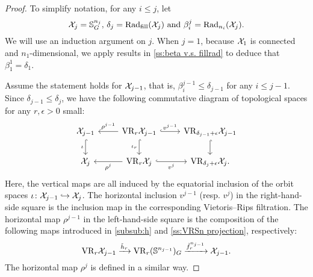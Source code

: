 \begin{proof}
    To simplify notation, for any $i \leq j$, let
    \[
        \mathcal{X}_j = \mathbb{S}^{n_j}_G, \,\delta_j = \mathrm{Rad}_{\mathrm{fill}}(\mathcal{X}_j) \text{ and }\beta_i^j = \mathrm{Rad}_{n_i}(\mathcal{X}_j).
    \]
	We will use an induction argument on $j$.
	When $j = 1$, because $\mathcal{X}_1$ is connected and $n_1$-dimensional, we apply results in \cref{ss:beta v.s. fillrad} to deduce that $\beta_1^1 = \delta_1$.

	Assume the statement holds for $\mathcal{X}_{j-1}$, that is, $\beta_i^{j-1} \leq \delta_{j-1}$ for any $i \leq j-1$.
	Since $\delta_{j-1} \leq \delta_j$, we have the following commutative diagram of topological spaces for any $r,\epsilon>0$ small:
    \begin{equation}\label{d:fundamental_bars_diagram}
        \begin{tikzcd}
            \cX_{j-1}
            \ar[d, hook,"{\iota}" left]
            &
            \VR_r\cX_{j-1}
            \ar[d, hook,"\iota_r" left]
            \ar[l, "\rho^{j-1}" above]
            \ar[r, hook, "v^{j-1}"]
            &
            \VR_{\delta_{j-1}+\epsilon}\cX_{j-1}
            \ar[d, hook]
            \\
            \cX_j
            &
            \VR_r\cX_j
            \ar[l, "\rho^j" below]
            \ar[r, hook, "v^j" below]
            &
            \VR_{\delta_j+\epsilon}\cX_j.
        \end{tikzcd}
    \end{equation}
    Here, the vertical maps are all induced by the equatorial inclusion of the orbit spaces $\iota \colon \mathcal{X}_{j-1} \hookrightarrow \mathcal{X}_j$.
    The horizontal inclusion $v^{j-1}$ (resp. $v^j$) in the right-hand-side square is the inclusion map in the corresponding Vietoris--Rips filtration.
    The horizontal map $\rho^{j-1}$ in the left-hand-side square is the composition of the following maps introduced in \cref{subsub:h} and \cref{ss:VRSn projection}, respectively:
    \[\mathrm{VR}_r\mathcal{X}_{j-1} \xrightarrow{\tilde{h}_r}\mathrm{VR}_r(\mathbb{S}^{n_{j-1}})_G \xrightarrow{\tilde{f}_r^{n_{j-1}}} \mathcal{X}_{j-1}.\]
    The horizontal map $\rho^j$ is defined in a similar way.


\end{proof}
